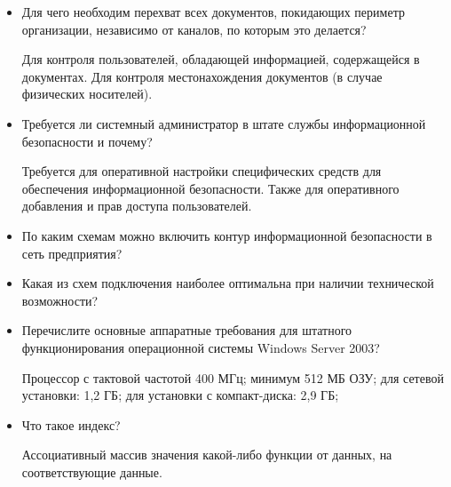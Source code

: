 \begin{itemize}
  \item Для чего необходим перехват всех документов, покидающих периметр
    организации, независимо от каналов, по которым это делается?

    Для контроля пользователей, обладающей информацией, содержащейся в
    документах. Для контроля местонахождения документов (в случае физических
    носителей).

  \item Требуется ли системный администратор в штате службы информационной
    безопасности и почему?

    Требуется для оперативной настройки специфических средств для обеспечения
    информационной безопасности. Также для оперативного добавления и
     прав доступа пользователей.

  \item По каким схемам можно включить контур информационной безопасности в
    сеть предприятия?
  \item Какая из схем подключения наиболее оптимальна при наличии технической
    возможности?
  \item Перечислите основные аппаратные требования для штатного
    функционирования операционной системы Windows Server 2003?

    Процессор с тактовой частотой 400 МГц;
    минимум 512 МБ ОЗУ;
    для сетевой установки: 1,2 ГБ;
    для установки с компакт-диска: 2,9 ГБ;

  \item Что такое индекс?

    Ассоциативный массив значения какой-либо функции от данных, на
    соответствующие данные.
 \end{itemize}
